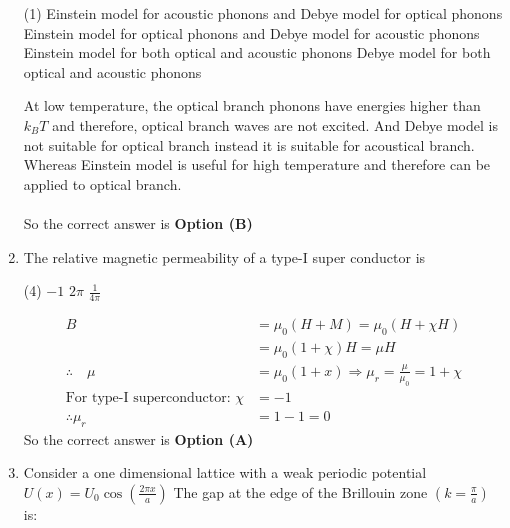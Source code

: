 \begin{enumerate}
\begin{tasks}(1)
	\task[\textbf{A.}] Einstein model for acoustic phonons and Debye model for optical phonons
	\task[\textbf{B.}] Einstein model for optical phonons and Debye model for acoustic phonons
	\task[\textbf{C.}]  Einstein model for both optical and acoustic phonons
	\task[\textbf{D.}] Debye model for both optical and acoustic phonons
\end{tasks}
\begin{answer}
	At low temperature, the optical branch phonons have energies higher than $k_{B} T$ and therefore, optical branch waves are not excited. And Debye model is not suitable for optical branch instead it is suitable for acoustical branch. Whereas Einstein model is useful for high temperature and therefore can be applied to optical branch.\\\\
	So the correct answer is \textbf{Option (B)}
\end{answer}
\item The relative magnetic permeability of a type-I super conductor is
{}

\begin{tasks}(4)
	\task[\textbf{B.}] $-1$
	\task[\textbf{C.}] $2 \pi$
	\task[\textbf{D.}] $\frac{1}{4 \pi}$
\end{tasks}
\begin{answer}
	\begin{align*}
	B&=\mu_{0}(H+M)=\mu_{0}(H+\chi H)\\&=\mu_{0}(1+\chi) H=\mu H\\
	\therefore \quad \mu&=\mu_{0}(1+x) \Rightarrow \mu_{r}=\frac{\mu}{\mu_{0}}=1+\chi\\
	\text{For type-I superconductor: }\chi&=-1\\
	\therefore \mu_{r}&=1-1=0
	\end{align*}
	So the correct answer is \textbf{Option (A)}
\end{answer}
\item Consider a one dimensional lattice with a weak periodic potential $U(x)=U_{0} \cos \left(\frac{2 \pi x}{a}\right)$ The gap at the edge of the Brillouin zone $\left(k=\frac{\pi}{a}\right)$ is:
{}


\end{enumerate}

